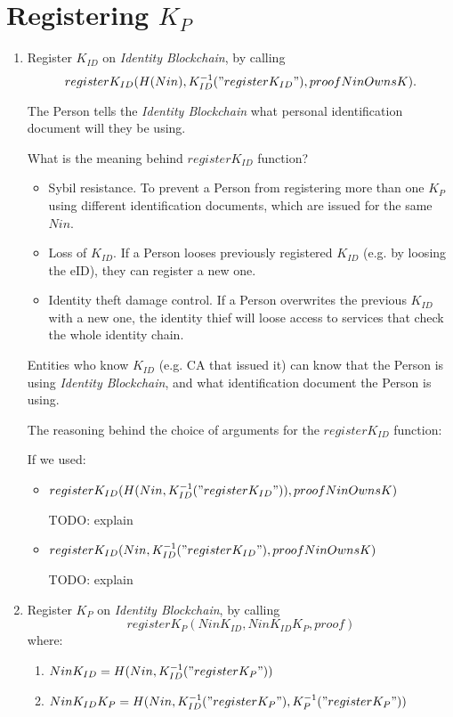\documentclass{article}
\newcommand{\khk}{K_{P}}
\newcommand{\kid}{K_{ID}}
\newcommand{\pbc}{\textit{Identity Blockchain}}
\begin{document}
\section{Registering $\khk$}
\begin{enumerate}
  \item Register $\kid$ on \pbc, by calling 
    $$register\kid(H(Nin), \kid^{-1}("register\kid"), proofNinOwnsK).$$
  
    The Person tells the \pbc{} what personal identification document will they be using.

    What is the meaning behind $register\kid$ function?
    \begin{itemize}
      \item Sybil resistance. To prevent a Person from registering more than one $\khk$ using different identification documents, which are issued for the same $Nin$.
      \item Loss of $\kid$. If a Person looses previously registered $\kid$ (e.g. by loosing the eID), they can register a new one.
      \item Identity theft damage control. If a Person overwrites the previous $\kid$ with a new one, the identity thief will loose access to services that check the whole identity chain.
    \end{itemize}

    Entities who know $\kid$ (e.g. CA that issued it) can know that the Person is using \pbc{}, and what identification document the Person is using.

    The reasoning behind the choice of arguments for the $register\kid$ function:

    If we used:
    \begin{itemize}
      \item $register\kid(H(Nin, \kid^{-1}("register\kid")), proofNinOwnsK)$

        TODO: explain
      \item $register\kid(Nin, \kid^{-1}("register\kid"), proofNinOwnsK)$

        TODO: explain
    \end{itemize}

  \item Register $\khk$ on \pbc, by calling 
    $$register\khk(Nin\kid, Nin\kid\khk, proof)$$
  where:
    \begin{enumerate}
      \item $Nin\kid=H(Nin,\kid^{-1}("register\khk"))$
      \item $Nin\kid\khk=H(Nin, \kid^{-1}("register\khk"), \khk^{-1}("register\khk"))$
    \end{enumerate}


\end{enumerate}
\end{document}
